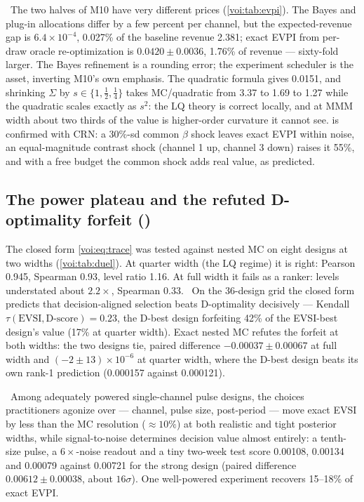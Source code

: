 \tagNumerical\ The two halves of M10 have very different prices (\cref{voi:tab:evpi}). The Bayes and plug-in allocations differ by a few percent per channel, but the expected-revenue gap is $6.4\times10^{-4}$, 0.027\% of the baseline revenue 2.381; exact EVPI from per-draw oracle re-optimization is $0.0420 \pm 0.0036$, 1.76\% of revenue --- sixty-fold larger. The Bayes refinement is a rounding error; the experiment scheduler is the asset, inverting M10's own emphasis. The quadratic formula gives 0.0151, and shrinking $\Sigma$ by $s \in \{1,\tfrac12,\tfrac14\}$ takes MC/quadratic from 3.37 to 1.69 to 1.27 while the quadratic scales exactly as $s^2$: the LQ theory is correct locally, and at MMM width about two thirds of the value is higher-order curvature it cannot see.  is confirmed with CRN: a 30\%-sd common $\beta$ shock leaves exact EVPI within noise, an equal-magnitude contrast shock (channel 1 up, channel 3 down) raises it 55\%, and with a free budget the common shock adds real value, as predicted.

\subsection{The power plateau and the refuted D-optimality forfeit ()}

The closed form \cref{voi:eq:trace} was tested against nested MC on eight designs at two widths (\cref{voi:tab:duel}). At quarter width (the LQ regime) it is right: Pearson 0.945, Spearman 0.93, level ratio 1.16. At full width it fails as a ranker: levels understated about $2.2\times$, Spearman 0.33. \tagRefuted\ On the 36-design grid the closed form predicts that decision-aligned selection beats D-optimality decisively --- Kendall $\tau(\mathrm{EVSI},\text{D-score}) = 0.23$, the D-best design forfeiting 42\% of the EVSI-best design's value (17\% at quarter width). Exact nested MC refutes the forfeit at both widths: the two designs tie, paired difference $-0.00037 \pm 0.00067$ at full width and $(-2 \pm 13)\times10^{-6}$ at quarter width, where the D-best design beats its own rank-1 prediction (0.000157 against 0.000121).

\begin{law}
\label{voi:law:plateau}
\tagNumerical\ Among adequately powered single-channel pulse designs, the choices practitioners agonize over --- channel, pulse size, post-period --- move exact EVSI by less than the MC resolution ($\approx 10\%$) at both realistic and tight posterior widths, while signal-to-noise determines decision value almost entirely: a tenth-size pulse, a $6\times$-noise readout and a tiny two-week test score 0.00108, 0.00134 and 0.00079 against 0.00721 for the strong design (paired difference $0.00612 \pm 0.00038$, about $16\sigma$). One well-powered experiment recovers 15--18\% of exact EVPI.
\end{law}

